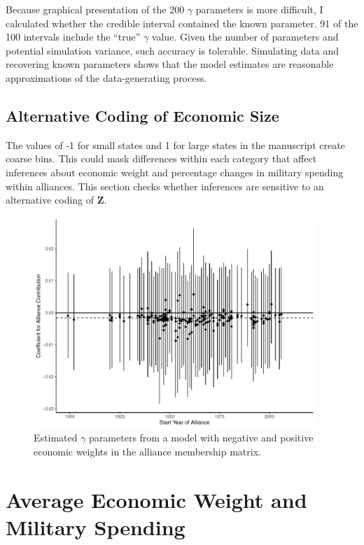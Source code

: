 \documentclass[12pt]{article}
\begin{document}
Because graphical presentation of the 200 $\gamma$ parameters is more difficult, I calculated whether the credible interval contained the known parameter. 
91 of the 100 intervals include the ``true'' $\gamma$ value. 
Given the number of parameters and potential simulation variance, such accuracy is tolerable. 
Simulating data and recovering known parameters shows that the model estimates are reasonable approximations of the data-generating process. 


\subsection{Alternative Coding of Economic Size}


The values of -1 for small states and 1 for large states in the manuscript create coarse bins. 
This could mask differences within each category that affect inferences about economic weight and percentage changes in military spending within alliances. 
This section checks whether inferences are sensitive to an alternative coding of $\textbf{Z}$. 






\begin{figure}[htbp]
	\centering
		\includegraphics[width=0.95\textwidth]{alliance-coefs-year-w.pdf}
	\caption{Estimated $\gamma$ parameters from a model with negative and positive economic weights in the alliance membership matrix.}
	\label{fig:alliance-coefs-year-w}
\end{figure}

\section{Average Economic Weight and Military Spending}
\end{document}
